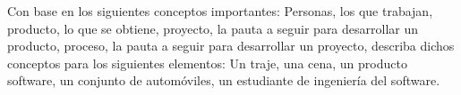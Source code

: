 Con base en los siguientes conceptos importantes: Personas, los que trabajan, producto, lo que se obtiene, proyecto, la pauta a seguir para desarrollar un producto, proceso, la pauta a seguir para desarrollar un proyecto, describa dichos conceptos para los siguientes elementos: Un traje, una cena, un producto software, un conjunto de automóviles, un estudiante de ingeniería del software.
